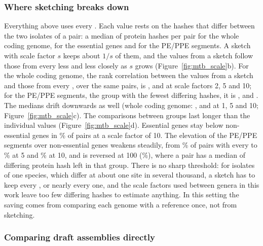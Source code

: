 \subsubsection*{Where sketching breaks down}

Everything above uses every \kmer. Each value rests on the hashes that differ between the two
isolates of a pair: a median of \mtbDifferingProteinWhole{} protein hashes per pair for the whole
coding genome, \mtbDifferingProteinEssential{} for the essential genes and
\mtbDifferingProteinPeppehq{} for the PE/PPE segments. A sketch with scale factor $s$ keeps about
$1/s$ of them, and the values from a sketch follow those from every \kmer less and less closely as $s$
grows (Figure~\ref{fig:mtb_scale}b). For the whole coding genome, the rank correlation between the
values from a sketch and those from every \kmer, over the same pairs, is \mtbSpearmanWholeScaleTwo{},
\mtbSpearmanWholeScaleFive{} and \mtbSpearmanWholeScaleTen{} at scale factors 2, 5 and 10; for the
PE/PPE segments, the group with the fewest differing hashes, it is \mtbSpearmanPeppehqScaleTwo{},
\mtbSpearmanPeppehqScaleFive{} and \mtbSpearmanPeppehqScaleTen{}. The medians drift downwards as well
(whole coding genome: \mtbMedianWhole{}, \mtbMedianWholeScaleFive{} and \mtbMedianWholeScaleTen{} at
1, 5 and 10; Figure~\ref{fig:mtb_scale}c). The comparisons between groups last longer than the
individual values (Figure~\ref{fig:mtb_scale}d). Essential genes stay below non-essential genes in
\mtbHoldsEssentialBelowNonessentialScaleTen\% of pairs at a scale factor of 10. The elevation of the
PE/PPE segments over non-essential genes weakens steadily, from
\mtbHoldsNonessentialBelowPeppehqScaleOne\% of pairs with every \kmer to
\mtbHoldsNonessentialBelowPeppehqScaleFive\% at 5 and \mtbHoldsNonessentialBelowPeppehqScaleTen\% at
10, and is reversed at 100 (\mtbHoldsNonessentialBelowPeppehqScaleHundred\%), where a pair has a
median of \mtbDifferingProteinPeppehqScaleHundred{} differing protein hash left in that group. There
is no sharp threshold: for isolates of one species, which differ at about one site in several
thousand, a sketch has to keep every \kmer, or nearly every one, and the scale factors used between
genera in this work leave too few differing hashes to estimate anything. In this setting the saving
comes from comparing each genome with a reference once, not from sketching.

\subsubsection*{Comparing draft assemblies directly}

